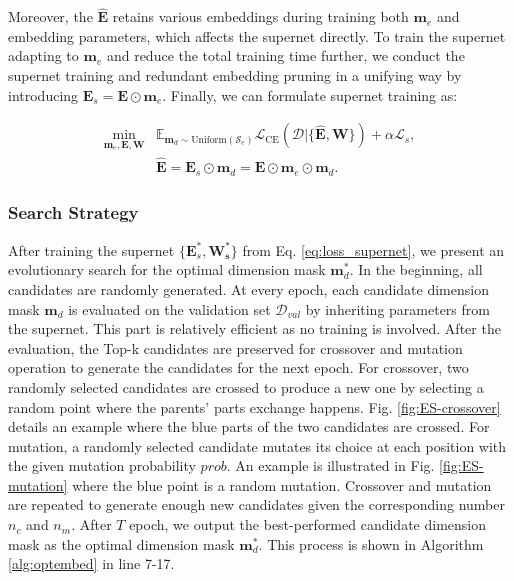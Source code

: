 \documentclass[sigconf]{acmart}
\begin{document}
Moreover, the $\hat{\mathbf{E}}$ retains various embeddings during training both $\mathbf{m}_e$ and embedding parameters, which affects the supernet directly. To train the supernet adapting to $\mathbf{m}_e$ and reduce the total training time further, we conduct the supernet training and redundant embedding pruning in a unifying way by introducing $\mathbf{E}_s = \mathbf{E} \odot \mathbf{m}_e$. Finally, we can formulate supernet training as:

\begin{equation}
\label{eq:loss_supernet}
\begin{aligned}
    \min_{\mathbf{m}_e, \mathbf{E}, \mathbf{W}} & \mathbb{E}_{\mathbf{m}_d \sim \text{Uniform}(\mathcal{S}_e)} \mathcal{L}_{\text{CE}}(\mathcal{D}|\{\hat{\mathbf{E}}, \mathbf{W}\}) + \alpha \mathcal{L}_s, \\
    & \hat{\mathbf{E}} = \mathbf{E}_s \odot \mathbf{m}_d =  \mathbf{E} \odot  \mathbf{m}_e \odot \mathbf{m}_d  .
\end{aligned}
\end{equation}



\subsubsection{Search Strategy} After training the supernet $\{\mathbf{E}^{*}_s, \mathbf{W^{*}_s}\}$ from Eq. \ref{eq:loss_supernet}, we present an evolutionary search for the optimal dimension mask $\mathbf{m}^{*}_d$. In the beginning, all candidates are randomly generated. At every epoch, each candidate dimension mask $\mathbf{m}_d$ is evaluated on the validation set $\mathcal{D}_{val}$ by inheriting parameters from the supernet. This part is relatively efficient as no training is involved. After the evaluation, the Top-k candidates are preserved for crossover and mutation operation to generate the candidates for the next epoch. For crossover, two randomly selected candidates are crossed to produce a new one by selecting a random point where the parents’ parts exchange happens. Fig. \ref{fig:ES-crossover} details an example where the blue parts of the two candidates are crossed. For mutation, a randomly selected candidate mutates its choice at each position with the given mutation probability $prob$. An example is illustrated in Fig. \ref{fig:ES-mutation} where the blue point is a random mutation. Crossover and mutation are repeated to generate enough new candidates given the corresponding number $n_c$ and $n_m$. After $T$ epoch, we output the best-performed candidate dimension mask as the optimal dimension mask $\mathbf{m}_d^*$. This process is shown in Algorithm \ref{alg:optembed} in line 7-17. \vspace{-10pt}
\end{document}
